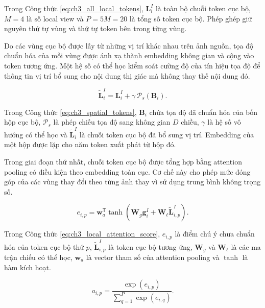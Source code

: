 Trong Công thức \ref{eq:ch3_all_local_tokens}, $\boldsymbol{L}_{i}^{I}$ là toàn bộ chuỗi token cục bộ, $M=4$ là số local view và $P=5M=20$ là tổng số token cục bộ. Phép ghép giữ nguyên thứ tự vùng và thứ tự token bên trong từng vùng.

Do các vùng cục bộ được lấy từ những vị trí khác nhau trên ảnh nguồn, tọa độ chuẩn hóa của mỗi vùng được ánh xạ thành embedding không gian và cộng vào token tương ứng. Một hệ số có thể học kiểm soát cường độ của tín hiệu tọa độ để thông tin vị trí bổ sung cho nội dung thị giác mà không thay thế nội dung đó.

\begin{equation}\widetilde{\boldsymbol{L}}_{i}^{I}=\boldsymbol{L}_{i}^{I}+\gamma\,\mathcal{P}_{s}\left(\boldsymbol{B}_{i}\right).\label{eq:ch3_spatial_tokens}\end{equation}

Trong Công thức \ref{eq:ch3_spatial_tokens}, $\boldsymbol{B}_{i}$ chứa tọa độ đã chuẩn hóa của bốn hộp cục bộ, $\mathcal{P}_{s}$ là phép chiếu tọa độ sang không gian $D$ chiều, $\gamma$ là hệ số vô hướng có thể học và $\widetilde{\boldsymbol{L}}_{i}^{I}$ là chuỗi token cục bộ đã bổ sung vị trí. Embedding của một hộp được lặp cho năm token xuất phát từ hộp đó.

Trong giai đoạn thứ nhất, chuỗi token cục bộ được tổng hợp bằng attention pooling có điều kiện theo embedding toàn cục. Cơ chế này cho phép mức đóng góp của các vùng thay đổi theo từng ảnh thay vì sử dụng trung bình không trọng số.

\begin{equation}e_{i,p}=\boldsymbol{w}_{a}^{\mathsf{T}}\tanh\left(\boldsymbol{W}_{g}\boldsymbol{g}_{i}^{I}+\boldsymbol{W}_{\ell}\widetilde{\boldsymbol{L}}_{i,p}^{I}\right).\label{eq:ch3_local_attention_score}\end{equation}

Trong Công thức \ref{eq:ch3_local_attention_score}, $e_{i,p}$ là điểm chú ý chưa chuẩn hóa của token cục bộ thứ $p$, $\widetilde{\boldsymbol{L}}_{i,p}^{I}$ là token cục bộ tương ứng, $\boldsymbol{W}_{g}$ và $\boldsymbol{W}_{\ell}$ là các ma trận chiếu có thể học, $\boldsymbol{w}_{a}$ là vector tham số của attention pooling và $\tanh$ là hàm kích hoạt.

\begin{equation}a_{i,p}=\frac{\exp\left(e_{i,p}\right)}{\sum_{q=1}^{P}\exp\left(e_{i,q}\right)}.\label{eq:ch3_local_attention_weight}\end{equation}

